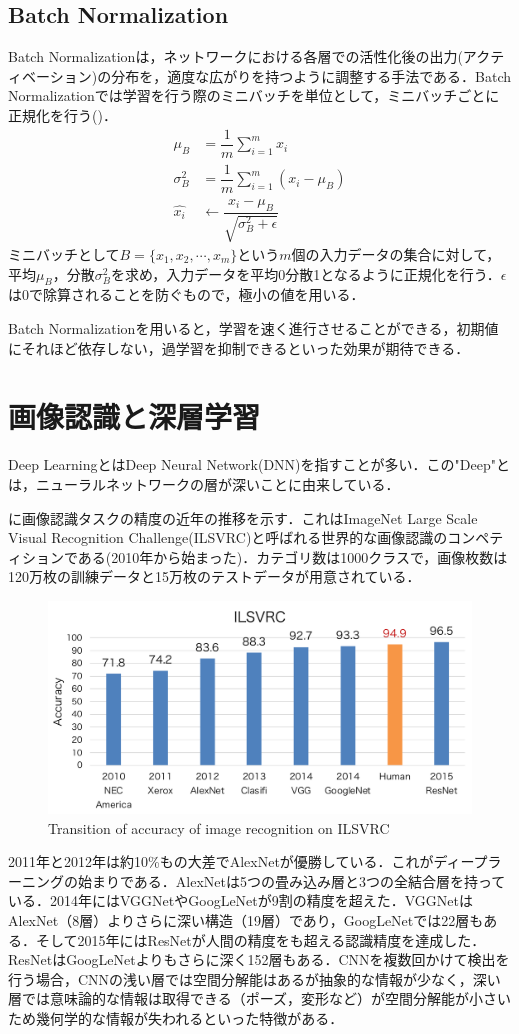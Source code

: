 \subsection*{Batch Normalization}
Batch Normalization\cite{BatchNorm}は，ネットワークにおける各層での活性化後の出力(アクティベーション)の分布を，適度な広がりを持つように調整する手法である．Batch Normalizationでは学習を行う際のミニバッチを単位として，ミニバッチごとに正規化を行う()．
\begin{align}\label{eq:BatchNorm}
	\mu_B & = \dfrac{1}{m}\sum_{i=1}^m x_i \\
	\sigma_B^2 & = \dfrac{1}{m}\sum_{i=1}^m (x_i - \mu_B) \\
	\hat{x_i} & \leftarrow \dfrac{x_i - \mu_B}{\sqrt{\sigma_B^2 + \epsilon}}
\end{align}
ミニバッチとして$B = \{x_1, x_2, \cdots, x_m\}$という$m$個の入力データの集合に対して，平均$\mu_B$，分散$\sigma_B^2$を求め，入力データを平均0分散1となるように正規化を行う．$\epsilon$は0で除算されることを防ぐもので，極小の値を用いる．

Batch Normalizationを用いると，学習を速く進行させることができる，初期値にそれほど依存しない，過学習を抑制できるといった効果が期待できる．


\section{画像認識と深層学習}
Deep LearningとはDeep Neural Network(DNN)を指すことが多い．この"Deep"とは，ニューラルネットワークの層が深いことに由来している．

に画像認識タスクの精度の近年の推移を示す．これはImageNet Large Scale Visual Recognition Challenge(ILSVRC)と呼ばれる世界的な画像認識のコンペティションである(2010年から始まった)．カテゴリ数は1000クラスで，画像枚数は120万枚の訓練データと15万枚のテストデータが用意されている．
\begin{figure}[H]
	\centering
	\includegraphics[width=0.7\linewidth]{figure/chapter2/ILSVRC}
	\caption{Transition of accuracy of image recognition on ILSVRC}
	\label{fig:ImageNet}
\end{figure}
2011年と2012年は約10\%もの大差でAlexNet\cite{AlexNet}が優勝している．これがディープラーニングの始まりである．AlexNetは5つの畳み込み層と3つの全結合層を持っている．2014年にはVGGNet\cite{VGGNet}やGoogLeNet\cite{GoogLeNet}が9割の精度を超えた．VGGNetはAlexNet（8層）よりさらに深い構造（19層）であり，GoogLeNetでは22層もある．そして2015年にはResNet\cite{ResNet}が人間の精度をも超える認識精度を達成した．ResNetはGoogLeNetよりもさらに深く152層もある．CNNを複数回かけて検出を行う場合，CNNの浅い層では空間分解能はあるが抽象的な情報が少なく，深い層では意味論的な情報は取得できる（ポーズ，変形など）が空間分解能が小さいため幾何学的な情報が失われるといった特徴がある．

